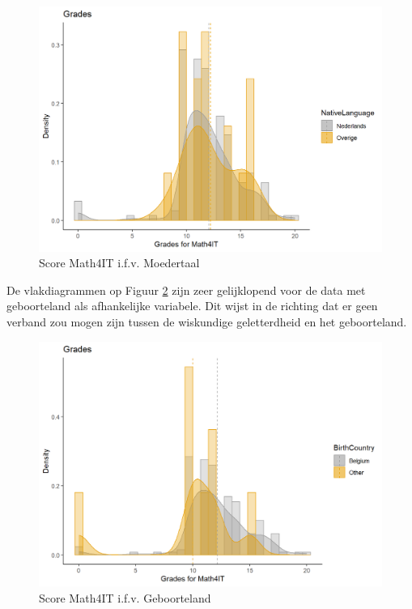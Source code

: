 \documentclass{hogent-article}
\begin{document}
\begin{figure}
\includegraphics[width=\linewidth]{Histogram-GradeMath4IT-NativeLanguage.png}
\caption{\label{fig:4} Score Math4IT i.f.v. Moedertaal}
\end{figure}

De vlakdiagrammen op Figuur \ref{fig:5} zijn zeer gelijklopend voor de data met geboorteland als afhankelijke variabele. Dit wijst in de richting dat er geen verband zou mogen zijn tussen de wiskundige geletterdheid en het geboorteland.

\begin{figure}
    \includegraphics[width=\linewidth]{Histogram-GradeMath4IT-BirthCountry.png}
    \caption{\label{fig:5} Score Math4IT i.f.v. Geboorteland}
\end{figure}
\end{document}
